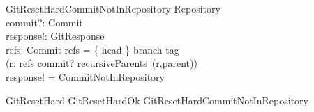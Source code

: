 \begin{schema}{GitResetHardCommitNotInRepository}
  \Xi Repository \\
  commit?: Commit \\
  response!: GitResponse \\
  refs: \finset Commit
\where
  refs = \{ head \} \cup \ran branch \cup \ran tag \\
  \lnot (\exists r: refs \spot commit? \in recursiveParents~(r,parent)) \\
  response! = CommitNotInRepository
\end{schema}

\begin{zed}
  GitResetHard  GitResetHardOk \lor GitResetHardCommitNotInRepository
\end{zed}



